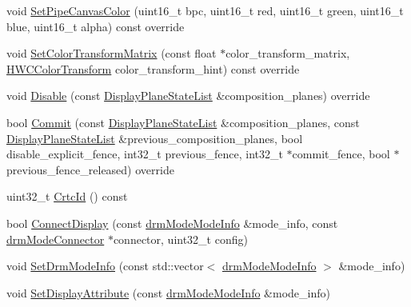 \begin{DoxyCompactItemize}
\item 
void \mbox{\hyperlink{classhwcomposer_1_1DrmDisplay_aca6b6791dc9c5a4498895509e854bcfa}{Set\+Pipe\+Canvas\+Color}} (uint16\+\_\+t bpc, uint16\+\_\+t red, uint16\+\_\+t green, uint16\+\_\+t blue, uint16\+\_\+t alpha) const override
\item 
void \mbox{\hyperlink{classhwcomposer_1_1DrmDisplay_a43bbf2421bd4b0b4e7b0612020060e3e}{Set\+Color\+Transform\+Matrix}} (const float $\ast$color\+\_\+transform\+\_\+matrix, \mbox{\hyperlink{hwcdefs_8h_a1a2c55aec4fbd12a1e323f2bdb3e9b88}{H\+W\+C\+Color\+Transform}} color\+\_\+transform\+\_\+hint) const override
\item 
void \mbox{\hyperlink{classhwcomposer_1_1DrmDisplay_a4596c2736f70fdd4c87ceb2dccf14848}{Disable}} (const \mbox{\hyperlink{namespacehwcomposer_adf383ae435d39a5631a8ad82e7fa18a4}{Display\+Plane\+State\+List}} \&composition\+\_\+planes) override
\item 
bool \mbox{\hyperlink{classhwcomposer_1_1DrmDisplay_a83b00eac01a21d6a5e50b4664df6b279}{Commit}} (const \mbox{\hyperlink{namespacehwcomposer_adf383ae435d39a5631a8ad82e7fa18a4}{Display\+Plane\+State\+List}} \&composition\+\_\+planes, const \mbox{\hyperlink{namespacehwcomposer_adf383ae435d39a5631a8ad82e7fa18a4}{Display\+Plane\+State\+List}} \&previous\+\_\+composition\+\_\+planes, bool disable\+\_\+explicit\+\_\+fence, int32\+\_\+t previous\+\_\+fence, int32\+\_\+t $\ast$commit\+\_\+fence, bool $\ast$previous\+\_\+fence\+\_\+released) override
\item 
uint32\+\_\+t \mbox{\hyperlink{classhwcomposer_1_1DrmDisplay_ac4ec96746c9dba9cce59b4bdce0a87ff}{Crtc\+Id}} () const
\item 
bool \mbox{\hyperlink{classhwcomposer_1_1DrmDisplay_abbf3b8fc423292df5fe6b9df791977c4}{Connect\+Display}} (const \mbox{\hyperlink{nativedisplay_8h_a00e4eec8ca028fd8f4672b5e60fbf2cd}{drm\+Mode\+Mode\+Info}} \&mode\+\_\+info, const \mbox{\hyperlink{nativedisplay_8h_a16ea3fc6b16060fd1e1257707006440e}{drm\+Mode\+Connector}} $\ast$connector, uint32\+\_\+t config)
\item 
void \mbox{\hyperlink{classhwcomposer_1_1DrmDisplay_a922407311e0d418894e4968712f2bf03}{Set\+Drm\+Mode\+Info}} (const std\+::vector$<$ \mbox{\hyperlink{nativedisplay_8h_a00e4eec8ca028fd8f4672b5e60fbf2cd}{drm\+Mode\+Mode\+Info}} $>$ \&mode\+\_\+info)
\item 
void \mbox{\hyperlink{classhwcomposer_1_1DrmDisplay_a1a72c20b148b0cf2c1174a34da8a95dc}{Set\+Display\+Attribute}} (const \mbox{\hyperlink{nativedisplay_8h_a00e4eec8ca028fd8f4672b5e60fbf2cd}{drm\+Mode\+Mode\+Info}} \&mode\+\_\+info)

\end{DoxyCompactItemize}
